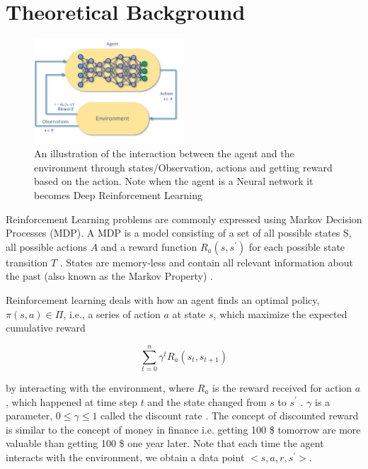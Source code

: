 \documentclass[10pt,twocolumn,letterpaper]{article}
\begin{document}
\section{Theoretical Background}
\label{rl}

\begin{figure}[h]
   \centering
    \includegraphics[width=0.50\textwidth]{images/agent-env-intraction3.png}
    \caption{An illustration of the interaction between the agent and the environment
through states/Observation, actions and getting reward based on the action. Note when the agent is a Neural network it becomes Deep Reinforcement Learning }
    \label{fig:basic}
\end{figure}

 Reinforcement Learning problems are commonly expressed using Markov Decision Processes (MDP). A MDP is a model consisting of a set of all possible states S, all possible actions $ A $ and a reward function $ R _ { a } \left( s , s ^ { \prime } \right) $ for each possible state transition $ T $ . States are memory-less and contain all relevant information about the past (also known as the Markov Property) \cite{Sutton1988ReinforcementLA}.

Reinforcement learning deals with how an agent finds an optimal policy, $\pi (s, a ) \in \Pi $, i.e., a series of action $ a $ at state $ s $, which maximize the expected cumulative reward

\begin{equation} 
\label{eq:1}
\sum _ { t = 0 } ^ { n } \gamma ^ { t } R _ { a } \left( s _ { t } , s _ { t + 1 } \right) 
\end{equation}
 

by interacting with the environment, where $R _ { a }$ is the reward received for action $ a $, which happened at time step $ t $ and the state changed from $ s $ to $ s^ { \prime } $ . $ \gamma $ is a parameter, $ 0 \leq \gamma \leq 1 $ called the discount rate \cite{Sutton1988ReinforcementLA}. The concept of discounted reward is similar to the concept of money in finance i.e. getting 100 \$ tomorrow are more valuable than getting 100 \$ one year later. Note that each time the agent interacts with the environment, we obtain a data point $<s,a,r,s^{\prime} > $.
\end{document}
